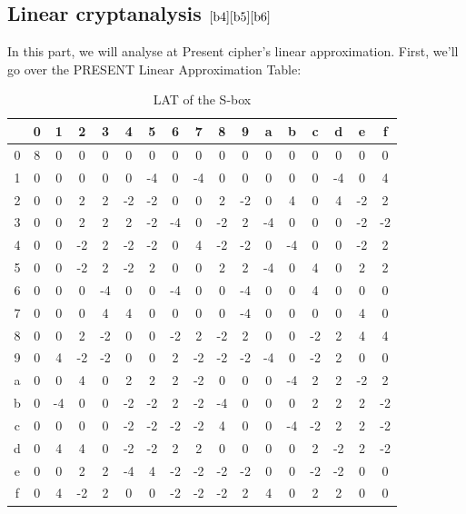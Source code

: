 \documentclass[journal=tosc,preprint]{iacrtrans}
\begin{document}
\subsection{Linear cryptanalysis $\cite{b4}\cite{b5}\cite{b6}$}
In this part, we will analyse at Present cipher's linear approximation. First, we'll go over the PRESENT Linear Approximation Table:\\
\begin{table}[h!]
	\centering
	\caption{LAT of the S-box}
	\begin{tabular}{ |c||c|c|c|c|c|c|c|c|c|c|c|c|c|c|c|c| }
		\hline
		& 0 & 1 & 2 & 3&4& 5& 6&7&8&9&a&b&c&d&e&f  \\ \hline \hline
		0& 8 & 0 & 0 & 0 & 0 & 0 & 0 & 0 & 0 & 0 & 0 & 0 & 0 & 0 & 0 & 0 \\ 
		1& 0 & 0 & 0 & 0 & 0 & -4 & 0 & -4 & 0 & 0 & 0 & 0 & 0 & -4 & 0 & 4 \\
		2& 0 & 0 & 2 & 2 & -2 & -2 & 0 & 0 & 2 & -2 & 0 & 4 & 0 & 4 & -2 & 2 \\
		3& 0 & 0 & 2 & 2 & 2 & -2 & -4 & 0 & -2 & 2 & -4 & 0 & 0 & 0 & -2 & -2 \\
		4& 0 & 0 & -2 & 2 & -2 & -2 & 0 & 4 & -2 & -2 & 0 & -4 & 0 & 0 & -2 & 2 \\
		5& 0 & 0 & -2 & 2 & -2 & 2 & 0 & 0 & 2 & 2 & -4 & 0 & 4 & 0 & 2 & 2\\
		6& 0 & 0 & 0 & -4 & 0 & 0 & -4 & 0 & 0 & -4 & 0 & 0 & 4 & 0 & 0 & 0\\
		7& 0 & 0 & 0 & 4 & 4 & 0 & 0 & 0 & 0 & -4 & 0 & 0 & 0 & 0 & 4 & 0\\
		8& 0 & 0 & 2 & -2 & 0 & 0 & -2 & 2 & -2 & 2 & 0 & 0 & -2 & 2 & 4 & 4\\
		9& 0 & 4 & -2 & -2 & 0 & 0 & 2 & -2 & -2 & -2 & -4 & 0 & -2 & 2 & 0 & 0\\
		a& 0 & 0 & 4 & 0 & 2 & 2 & 2 & -2 & 0 & 0 & 0 & -4 & 2 & 2 & -2 & 2\\
		b& 0 & -4 & 0 & 0 & -2 & -2 & 2 & -2 & -4 & 0 & 0 & 0 & 2 & 2 & 2 & -2\\
		c& 0 & 0 & 0 & 0 & -2 & -2 & -2 & -2 & 4 & 0 & 0 & -4 & -2 & 2 & 2 & -2\\
		d& 0 & 4 & 4 & 0 & -2 & -2 & 2 & 2 & 0 & 0 & 0 & 0 & 2 & -2 & 2 & -2\\
		e& 0 & 0 & 2 & 2 & -4 & 4 & -2 & -2 & -2 & -2 & 0 & 0 & -2 & -2 & 0 & 0\\
		f& 0 & 4 & -2 & 2 & 0 & 0 & -2 & -2 & -2 & 2 & 4 & 0 & 2 & 2 & 0 & 0\\
		\hline
	\end{tabular}
\end{table}\\
\end{document}
